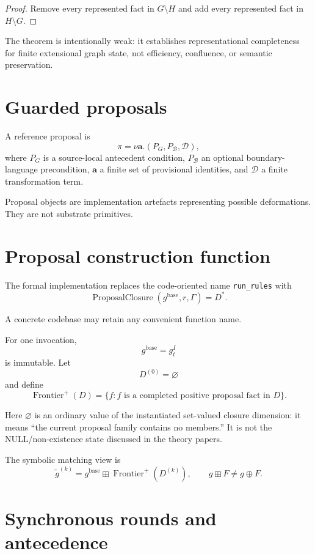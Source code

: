 \documentclass[11pt,a4paper]{article}
\theoremstyle{remark}
\begin{document}
\begin{proof}
Remove every represented fact in $G\setminus H$ and add every represented fact in $H\setminus G$.
\end{proof}

The theorem is intentionally weak: it establishes representational completeness for finite extensional graph state, not efficiency, confluence, or semantic preservation.

\section{Guarded proposals}\label{sec:proposals}

A reference proposal is
\[
\pi=\nu\mathbf a.(P_G,P_{\mathcal B},\mathcal D),
\]
where $P_G$ is a source-local antecedent condition, $P_{\mathcal B}$ an optional boundary-language precondition, $\mathbf a$ a finite set of provisional identities, and $\mathcal D$ a finite transformation term.

Proposal objects are implementation artefacts representing possible deformations. They are not substrate primitives.

\section{Proposal construction function}\label{sec:closure-function}

The formal implementation replaces the code-oriented name \texttt{run\_rules} with
\[
\boxed{
\operatorname{ProposalClosure}
(g^{\mathrm{base}},r,\Gamma)
=
D^*.
}
\]

A concrete codebase may retain any convenient function name.

For one invocation,
\[
g^{\mathrm{base}}=g_t^I
\]
is immutable. Let
\[
D^{(0)}=\varnothing
\]
and define
\[
\operatorname{Frontier}^+(D)
=
\{f:f\text{ is a completed positive proposal fact in }D\}.
\]

Here $\varnothing$ is an ordinary value of the instantiated set-valued closure dimension: it means ``the current proposal family contains no members.'' It is not the NULL/non-existence state discussed in the theory papers.

The symbolic matching view is
\[
\widetilde g^{(k)}
=
g^{\mathrm{base}}
\boxplus
\operatorname{Frontier}^+(D^{(k)}),
\qquad
g\boxplus F\neq g\oplus F.
\]

\section{Synchronous rounds and antecedence}\label{sec:rounds}
\end{document}

